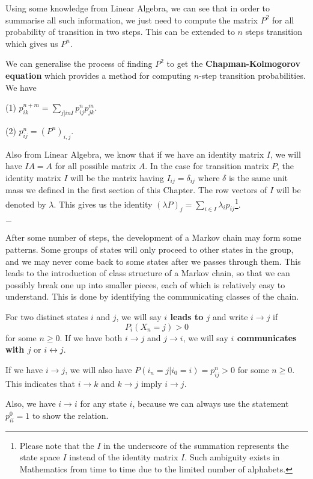 \documentclass[11pt, a4paper, oneside]{book}
\theoremstyle{definition}
\def\lra{\leftrightarrow}
\newcommand{\breaking}{%
    \begin{center}
    $-$
    \end{center}%
}
\begin{document}
\noindent Using some knowledge from Linear Algebra, we can see that in order to summarise all such information, we just need to compute the matrix $P^2$ for all probability of transition in two steps. This can be extended to $n$ steps transition which gives us $P^n$.

\noindent We can generalise the process of finding $P^2$ to get the \textbf{Chapman-Kolmogorov equation} which provides a method for computing $n$-step transition probabilities. We have 

(1) $p_{ik}^{n+m} = \sum_{j ]in I} p_{ij}^{n} p_{jk}^{m}.$

(2) $p_{ij}^{n} = (P^n)_{i,j}.$

\noindent Also from Linear Algebra, we know that if we have an identity matrix $I$, we will have $I A = A$ for all possible matrix $A$. In the case for transition matrix $P$, the identity matrix $I$ will be the matrix having $I_{ij}=\delta_{ij}$ where $\delta$ is the same unit mass we defined in the first section of this Chapter. The row vectors of $I$ will be denoted by $\lambda$. This gives us the identity $(\lambda P)_j = \sum_{i \in I}\lambda_i p_{ij}$\footnote{Please note that the $I$ in the underscore of the summation represents the state space $I$ instead of the identity matrix $I$. Such ambiguity exists in Mathematics from time to time due to the limited number of alphabets.}.

\breaking

\noindent After some number of steps, the development of a Markov chain may form some patterns. Some groups of states will only proceed to other states in the group, and we may never come back to some states after we passes through them. This leads to the introduction of class structure of a Markov chain, so that we can possibly break one up into smaller pieces, each of which is relatively easy to understand. This is done by identifying the communicating classes of the chain.

\noindent For two distinct states $i$ and $j$, we will say \textbf{$i$ leads to $j$} and write $i \to j$ if\[
P_i(X_n = j) > 0 
\]
for some $n \ge 0$. If we have both $i \to j$ and $j \to i$, we will say \textbf{$i$ communicates with $j$} or $i \lra j$. 

\noindent If we have $i \to j$, we will also have $P(i_n = j \vert i_0 = i) = p_{ij}^n > 0$ for some $n \ge 0$. This indicates that $i \to k$ and $k \to j$ imply $i \to j$. 

\noindent Also, we have $i \to i$ for any state $i$, because we can always use the statement $p_{ii}^0 = 1$ to show the relation.
\end{document}
